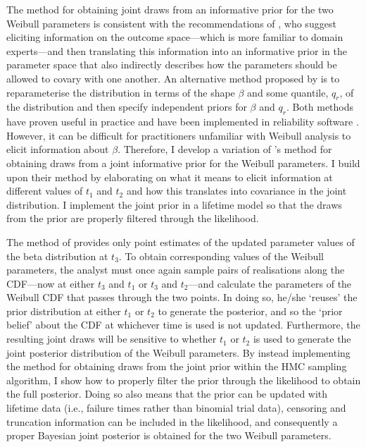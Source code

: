 The method for obtaining joint draws from an informative prior for the two Weibull parameters is consistent with the recommendations of \citet{gelman_workflow_2020}, who suggest eliciting information on the outcome space---which is more familiar to domain experts---and then translating this information into an informative prior in the parameter space that also indirectly describes how the parameters should be allowed to covary with one another. An alternative method proposed by \citet{Meeker2022} is to reparameterise the distribution in terms of the shape $\beta$ and some quantile, $q_r$, of the distribution and then specify independent priors for $\beta$ and $q_r$. Both methods have proven useful in practice and have been implemented in reliability software \citep{krivtsov2017}. However, it can be difficult for practitioners unfamiliar with Weibull analysis to elicit information about $\beta$. Therefore, I develop a variation of \citeauthor{kaminskiy2005}'s method for obtaining draws from a joint informative prior for the Weibull parameters. I build upon their method by elaborating on what it means to elicit information at different values of $t_1$ and $t_2$ and how this translates into covariance in the joint distribution. I implement the joint prior in a lifetime model so that the draws from the prior are properly filtered through the likelihood.

The method of \citet{kaminskiy2005} provides only point estimates of the updated parameter values of the beta distribution at $t_3$. To obtain corresponding values of the Weibull parameters, the analyst must once again sample pairs of realisations along the CDF---now at either $t_3$ and $t_1$ or $t_3$ and $t_2$---and calculate the parameters of the Weibull CDF that passes through the two points. In doing so, he/she `reuses' the prior distribution at either $t_1$ or $t_2$ to generate the posterior, and so the `prior belief' about the CDF at whichever time is used is not updated. Furthermore, the resulting joint draws will be sensitive to whether $t_1$ or $t_2$ is used to generate the joint posterior distribution of the Weibull parameters. By instead implementing the method for obtaining draws from the joint prior within the HMC sampling algorithm, I show how to properly filter the prior through the likelihood to obtain the full posterior. Doing so also means that the prior can be updated with lifetime data (i.e., failure times rather than binomial trial data), censoring and truncation information can be included in the likelihood, and consequently a proper Bayesian joint posterior is obtained for the two Weibull parameters. 

